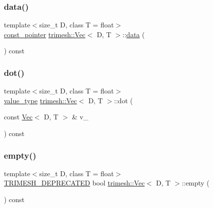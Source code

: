 \mbox{\label{classtrimesh_1_1Vec_aec880fd8fafe2b08e263bbc1b8e0d827}} 
\subsubsection{\texorpdfstring{data()}{data()}\hspace{0.1cm}{\footnotesize\ttfamily [2/2]}}
{\footnotesize\ttfamily template$<$size\+\_\+t D, class T = float$>$ \\
\hyperlink{classtrimesh_1_1Vec_ac1f9825bde0a5afde5c55e9e1052bcfd}{const\+\_\+pointer} \hyperlink{classtrimesh_1_1Vec}{trimesh\+::\+Vec}$<$ D, T $>$\+::\hyperlink{namespacetrimesh_ad9c3b218c6c8bf976dbcd9afb8740bb8}{data} (\begin{DoxyParamCaption}{ }\end{DoxyParamCaption}) const\hspace{0.3cm}{\ttfamily [inline]}}

\mbox{\label{classtrimesh_1_1Vec_a5f6c502820bd708b213c6b2d25c9a8a5}} 
\subsubsection{\texorpdfstring{dot()}{dot()}}
{\footnotesize\ttfamily template$<$size\+\_\+t D, class T = float$>$ \\
\hyperlink{classtrimesh_1_1Vec_a10a59253996e42d67c713f37592669df}{value\+\_\+type} \hyperlink{classtrimesh_1_1Vec}{trimesh\+::\+Vec}$<$ D, T $>$\+::dot (\begin{DoxyParamCaption}\item[{const \hyperlink{classtrimesh_1_1Vec}{Vec}$<$ D, T $>$ \&}]{v\+\_\+ }\end{DoxyParamCaption}) const\hspace{0.3cm}{\ttfamily [inline]}}

\mbox{\label{classtrimesh_1_1Vec_ab6045de61bcc7373f2810c48499dfd4c}} 
\subsubsection{\texorpdfstring{empty()}{empty()}}
{\footnotesize\ttfamily template$<$size\+\_\+t D, class T = float$>$ \\
\hyperlink{mathutil_8h_a642ee87acd19a9b33be6b7955d3dfcaa}{T\+R\+I\+M\+E\+S\+H\+\_\+\+D\+E\+P\+R\+E\+C\+A\+T\+ED} bool \hyperlink{classtrimesh_1_1Vec}{trimesh\+::\+Vec}$<$ D, T $>$\+::empty (\begin{DoxyParamCaption}{ }\end{DoxyParamCaption}) const\hspace{0.3cm}{\ttfamily [inline]}}

